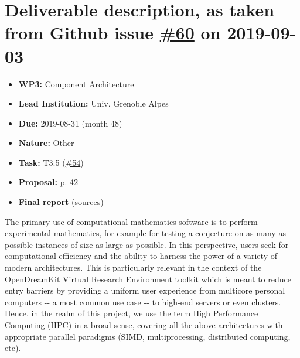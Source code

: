 \hypertarget{deliverable-description-as-taken-from-github-issue-60-on-2019-09-03}{%
\section*{\texorpdfstring{Deliverable description, as taken from Github
issue
\href{https://github.com/OpenDreamKit/OpenDreamKit/issues/60}{\#60} on
2019-09-03}{Deliverable description, as taken from Github issue \#60 on 2019-09-03}}\label{deliverable-description-as-taken-from-github-issue-60-on-2019-09-03}}

\begin{itemize}
\tightlist
\item
  \textbf{WP3:}
  \href{https://github.com/OpenDreamKit/OpenDreamKit/tree/master/WP3}{Component
  Architecture}
\item
  \textbf{Lead Institution:} Univ. Grenoble Alpes
\item
  \textbf{Due:} 2019-08-31 (month 48)
\item
  \textbf{Nature:} Other
\item
  \textbf{Task:} T3.5
  (\href{https://github.com/OpenDreamKit/OpenDreamKit/issues/54}{\#54})
\item
  \textbf{Proposal:}
  \href{https://github.com/OpenDreamKit/OpenDreamKit/raw/master/Proposal/proposal-www.pdf}{p.
  42}
\item
  \textbf{\href{https://github.com/OpenDreamKit/OpenDreamKit/raw/master/WP3/D3.11/report-final.pdf}{Final
  report}}
  (\href{https://github.com/OpenDreamKit/OpenDreamKit/raw/master/WP3/D3.11/}{sources})
\end{itemize}

The primary use of computational mathematics software is to perform
experimental mathematics, for example for testing a conjecture on as
many as possible instances of size as large as possible. In this
perspective, users seek for computational efficiency and the ability to
harness the power of a variety of modern architectures. This is
particularly relevant in the context of the OpenDreamKit Virtual
Research Environment toolkit which is meant to reduce entry barriers by
providing a uniform user experience from multicore personal computers
-\/- a most common use case -\/- to high-end servers or even clusters.
Hence, in the realm of this project, we use the term High Performance
Computing (HPC) in a broad sense, covering all the above architectures
with appropriate parallel paradigms (SIMD, multiprocessing, distributed
computing, etc).

